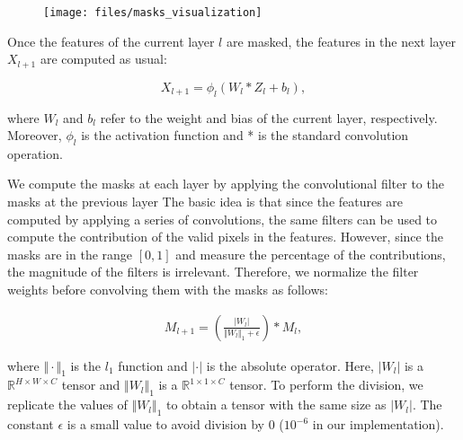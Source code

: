 \begin{figure}
  \texttt{[image: files/masks\_visualization]}
  \vspace{-0.3in}
  \caption{}
  \label{fig:masks}
  \vspace{-0.15in}
\end{figure}


Once the features of the current layer $l$ are masked, the features in the next layer $X_{l+1}$ are computed as usual:

\vspace{-8pt}
\begin{equation}
\label{eqn:02}
  X_{l+1} = \phi_l(W_{l}*Z_{l} + b_{l}),
\end{equation}
\vspace{-8pt}

\noindent  where $W_{l}$ and $b_{l}$ refer to the weight and bias of the current layer, respectively. Moreover, $\phi_l$ is the activation function and * is the standard convolution operation. 

We compute the masks at each layer by applying the convolutional filter to the masks at the previous layer  The basic idea is that since the features are computed by applying a series of convolutions, the same filters can be used to compute the contribution of the valid pixels in the features. However, since the masks are in the range $[0, 1]$ and measure the percentage of the contributions, the magnitude of the filters is irrelevant. Therefore, we normalize the filter weights before convolving them with the masks as follows:

\vspace{-2pt}
\begin{equation}
\label{eqn:03}
\begin{aligned}
  M_{l+1} = \left(\frac{\vert W_{l} \vert}{\Vert W_{l}\Vert_{1} + \epsilon}  \right) * M_{l},
\end{aligned}
\end{equation}
\vspace{-2pt}

\noindent where $\Vert \cdot \Vert_{1}$ is the $l_1$ function and $\vert \cdot \vert$ is the absolute operator. Here, $\vert W_{l} \vert$ is a $\mathbb{R}^{H \times W \times C}$ tensor and $\Vert W_{l} \Vert_{1}$ is a $\mathbb{R}^{1 \times 1 \times C}$ tensor. To perform the division, we replicate the values of $\Vert W_{l} \Vert_{1}$ to obtain a tensor with the same size as $\vert W_{l} \vert $. The constant $\epsilon$ is a small value to avoid division by 0 ($ 10^{-6}$ in our implementation).

